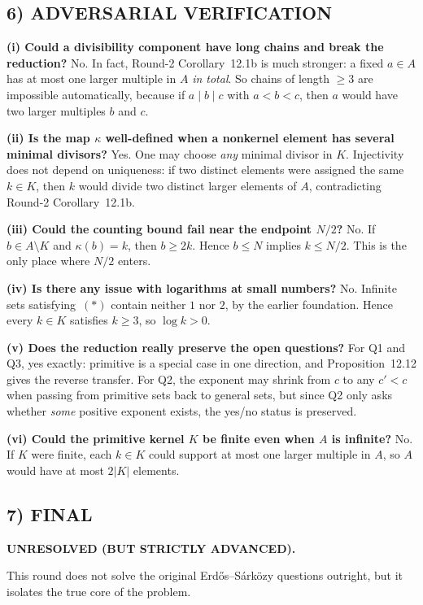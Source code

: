 \subsection*{6) ADVERSARIAL VERIFICATION}

\textbf{(i) Could a divisibility component have long chains and break the reduction?}
No. In fact, Round-2 Corollary~12.1b is much stronger: a fixed $a\in A$ has at most one larger multiple in $A$ \emph{in total}. So chains of length $\ge 3$ are impossible automatically, because if $a\mid b\mid c$ with $a<b<c$, then $a$ would have two larger multiples $b$ and $c$.

\textbf{(ii) Is the map $\kappa$ well-defined when a nonkernel element has several minimal divisors?}
Yes. One may choose \emph{any} minimal divisor in $K$. Injectivity does not depend on uniqueness: if two distinct elements were assigned the same $k\in K$, then $k$ would divide two distinct larger elements of $A$, contradicting Round-2 Corollary~12.1b.

\textbf{(iii) Could the counting bound fail near the endpoint $N/2$?}
No. If $b\in A\setminus K$ and $\kappa(b)=k$, then $b\ge 2k$. Hence $b\le N$ implies $k\le N/2$. This is the only place where $N/2$ enters.

\textbf{(iv) Is there any issue with logarithms at small numbers?}
No. Infinite sets satisfying~$(*)$ contain neither $1$ nor $2$, by the earlier foundation. Hence every $k\in K$ satisfies $k\ge 3$, so $\log k>0$.

\textbf{(v) Does the reduction really preserve the open questions?}
For Q1 and Q3, yes exactly: primitive is a special case in one direction, and Proposition~12.12 gives the reverse transfer.
For Q2, the exponent may shrink from $c$ to any $c'<c$ when passing from primitive sets back to general sets, but since Q2 only asks whether \emph{some} positive exponent exists, the yes/no status is preserved.

\textbf{(vi) Could the primitive kernel $K$ be finite even when $A$ is infinite?}
No. If $K$ were finite, each $k\in K$ could support at most one larger multiple in $A$, so $A$ would have at most $2|K|$ elements.

\subsection*{7) FINAL}

\textbf{UNRESOLVED (BUT STRICTLY ADVANCED).}

This round does not solve the original Erd\H{o}s--S\'ark\"ozy questions outright, but it isolates the true core of the problem.

